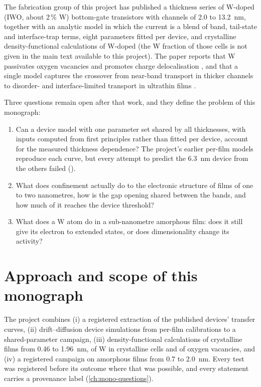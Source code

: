 The fabrication group of this project has published a thickness series of W-doped \InO{} (IWO, about 2\,\% W)
bottom-gate transistors with channels of 2.0 to 13.2~nm, together with an analytic model in which the current is a blend
of band, tail-state and interface-trap terms, eight parameters fitted per device, and crystalline density-functional
calculations of W-doped \InO{} \citep{Januar2026} (the W fraction of those cells is not given in the main text
available to this project). The paper reports that W passivates oxygen vacancies and promotes charge
delocalisation \citep[p.~4]{Januar2026}, and that a single model captures the crossover from near-band transport in
thicker channels to disorder- and interface-limited transport in ultrathin films \citep[p.~4]{Januar2026}.

Three questions remain open after that work, and they define the problem of this monograph:
\begin{enumerate}
\item Can a device model with one parameter set shared by all thicknesses, with inputs computed from first principles
rather than fitted per device, account for the measured thickness dependence? The project's earlier per-film models
reproduce each curve, but every attempt to predict the 6.3~nm device from the others failed ().
\item What does confinement actually do to the electronic structure of \InO{} films of one to two nanometres, how is the
gap opening shared between the bands, and how much of it reaches the device threshold?
\item What does a W atom do in a sub-nanometre amorphous film: does it still give its electron to extended states, or
does dimensionality change its activity?
\end{enumerate}

\section{Approach and scope of this monograph}
\label{sec:mono-intro-approach}

The project combines (i) a registered extraction of the published devices' transfer curves, (ii) drift--diffusion device
simulations from per-film calibrations to a shared-parameter campaign, (iii) density-functional calculations of crystalline
\InO{} films from 0.46 to 1.96~nm, of W in crystalline cells and of oxygen vacancies, and (iv) a registered campaign on
amorphous films from 0.7 to 2.0~nm. Every test was registered before its outcome where that was possible, and every
statement carries a provenance label (\cref{ch:mono-questions}).

